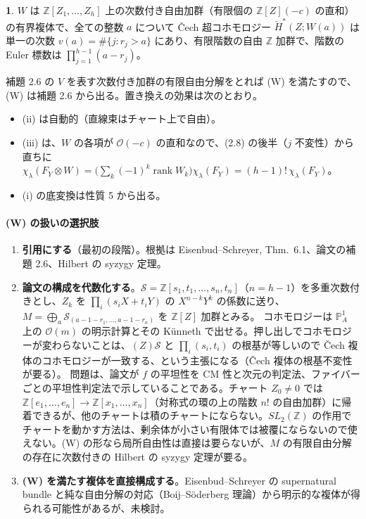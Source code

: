 \documentclass[11pt,a4paper]{ltjsarticle}
\newcommand{\stmtname}{}
\theoremstyle{plain}
\theoremstyle{definition}
\newtheorem*{dstmtgen}{\stmtname}
\newenvironment{dstmt}[1]{\renewcommand{\stmtname}{#1}\begin{dstmtgen}}{\end{dstmtgen}}
\newcommand{\rank}{\operatorname{rank}}
\newcommand{\Z}{\mathbb{Z}}
\newcommand{\PP}{\mathbb{P}}
\newcommand{\cO}{\mathcal{O}}
\begin{document}
\begin{dstmt}{(W)}
$W$ は $\Z[Z_1,\dots,Z_h]$ 上の次数付き自由加群（有限個の $\Z[Z](-c)$ の直和）の有界複体で、全ての整数 $a$ について Čech 超コホモロジー $\check H^*(Z;W(a))$ は単一の次数 $v(a) = \#\{j: r_j>a\}$ にあり、有限階数の自由 $\Z$ 加群で、階数の Euler 標数は $\prod_{j=1}^{h-1}(a-r_j)$。
\end{dstmt}
補題 2.6 の $V$ を表す次数付き加群の有限自由分解をとれば (W) を満たすので、(W) は補題 2.6 から出る。置き換えの効果は次のとおり。
\begin{itemize}
  \item (ii) は自動的（直線束はチャート上で自由）。
  \item (iii) は、$W$ の各項が $\cO(-c)$ の直和なので、(2.8) の後半（$j$ 不変性）から直ちに $\chi_\lambda(F_Y\otimes W) = \bigl(\sum_k(-1)^k\rank W_k\bigr)\chi_\lambda(F_Y) = (h-1)!\,\chi_\lambda(F_Y)$。
  \item (i) の底変換は性質 5 から出る。
\end{itemize}

\paragraph{(W) の扱いの選択肢}
\begin{enumerate}[label=(\alph*)]
  \item \textbf{引用にする}（最初の段階）。根拠は Eisenbud--Schreyer, Thm.~6.1、論文の補題 2.6、Hilbert の syzygy 定理。
  \item \textbf{論文の構成を代数化する}。$\mathcal{S} = \Z[s_1,t_1,\dots,s_n,t_n]$（$n = h-1$）を多重次数付きとし、$Z_k$ を $\prod_i(s_iX+t_iY)$ の $X^{n-k}Y^k$ の係数に送り、$M = \bigoplus_a\mathcal{S}_{(a-1-r_1,\dots,a-1-r_n)}$ を $\Z[Z]$ 加群とみる。
  コホモロジーは $\PP^1_A$ 上の $\cO(m)$ の明示計算とその Künneth で出せる。押し出しでコホモロジーが変わらないことは、$(Z)\mathcal{S}$ と $\prod_i(s_i,t_i)$ の根基が等しいので Čech 複体のコホモロジーが一致する、という主張になる（Čech 複体の根基不変性が要る）。
  問題は、論文が $f$ の平坦性を CM 性と次元の判定法、ファイバーごとの平坦性判定法で示していることである。チャート $Z_0\ne0$ では $\Z[e_1,\dots,e_n]\to\Z[x_1,\dots,x_n]$（対称式の環の上の階数 $n!$ の自由加群）に帰着できるが、他のチャートは積のチャートにならない。$SL_2(\Z)$ の作用でチャートを動かす方法は、剰余体が小さい有限体では被覆にならないので使えない。(W) の形なら局所自由性は直接は要らないが、$M$ の有限自由分解の存在に次数付きの Hilbert の syzygy 定理が要る。
  \item \textbf{(W) を満たす複体を直接構成する}。Eisenbud--Schreyer の supernatural bundle と純な自由分解の対応（Boij--Söderberg 理論）から明示的な複体が得られる可能性があるが、未検討。
\end{enumerate}
\end{document}
